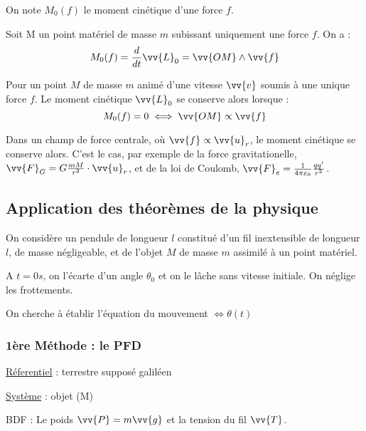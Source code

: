 \begin{definition}
    On note \(M_{0}(f)\) le moment cinétique d'une force \(f\). 
    \begin{theorem}
        Soit M un point matériel de masse \(m\) subissant uniquement une force \(f\). On a :
        \[
            M_{0}(f) = \frac{d}{dt}\vv{L}_{0}  = \vv{OM} \wedge  \vv{f}
        \]
    \end{theorem} 
\end{definition}

\begin{corollary}
    Pour un point \(M\) de masse \(m\) animé d'une vitesse \(\vv{v}\) soumis à une unique force \(f\). Le moment cinétique \(\vv{L}_{0}\) se conserve alors lorsque : 
    \[
        M_{0}(f) = 0 \iff \vv{OM} \propto \vv{f}
    \]  
\end{corollary}

\begin{eg}
    Dans un champ de force centrale, où \(\vv{f} \propto \vv{u}_{r}\), le moment cinétique se conserve alors. C'est le cas, par exemple de la force gravitationelle, \(\vv{F}_{G} = G \frac{mM}{r^{2}} \cdot \vv{u}_{r}\), et de la loi de Coulomb, \(\vv{F}_{e} = \frac{1}{4 \pi \varepsilon_{0}} \frac{qq'}{r^{2}}\). 
\end{eg}


\subsection{Application des théorèmes de la physique}

On considère un pendule de longueur \(l\) constitué d'un fil inextensible de longueur \(l\), de masse négligeable, et de l'objet \(M\) de masse \(m\) assimilé à un point matériel.\par
A \(t=0s\), on l'écarte d'un angle \(\theta_0\) et on le lâche sans vitesse initiale. On néglige les frottements.\par
On cherche à établir l'équation du mouvement \(\iff \theta(t)\)
\subsubsection{1ère Méthode : le PFD} 
\underline{Réferentiel} : terrestre supposé galiléen \par
\underline{Système} : {objet (M)}\par
BDF : Le poids \(\vv{P} = m\vv{g}\) et la tension du fil \(\vv{T}\).\par

